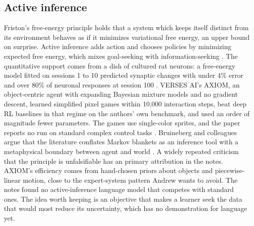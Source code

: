 \subsection{Active inference}
Friston's free-energy principle holds that a system which keeps itself distinct from its environment behaves as if it minimizes variational free energy, an upper bound on surprise. Active inference adds action and chooses policies by minimizing expected free energy, which mixes goal-seeking with information-seeking \cite{post45}. The quantitative support comes from a dish of cultured rat neurons: a free-energy model fitted on sessions 1 to 10 predicted synaptic changes with under 4\% error and over 80\% of neuronal responses at session 100 \cite{post46}. VERSES AI's AXIOM, an object-centric agent with expanding Bayesian mixture models and no gradient descent, learned simplified pixel games within 10,000 interaction steps, beat deep RL baselines in that regime on the authors' own benchmark, and used an order of magnitude fewer parameters. The games use single-color sprites, and the paper reports no run on standard complex control tasks \cite{post47}. Bruineberg and colleagues argue that the literature conflates Markov blankets as an inference tool with a metaphysical boundary between agent and world \cite{post48}. A widely repeated criticism that the principle is unfalsifiable has an \unverified{} primary attribution in the notes. AXIOM's efficiency comes from hand-chosen priors about objects and piecewise-linear motion, close to the expert-system pattern Andrew wants to avoid. The notes found no active-inference language model that competes with standard ones. The idea worth keeping is an objective that makes a learner seek the data that would most reduce its uncertainty, which has no demonstration for language yet.

